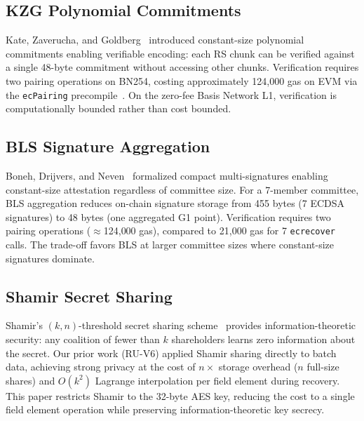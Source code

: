 \subsection{KZG Polynomial Commitments}

Kate, Zaverucha, and Goldberg~\cite{kate2010} introduced constant-size
polynomial commitments enabling verifiable encoding: each RS chunk can be
verified against a single 48-byte commitment without accessing other
chunks. Verification requires two pairing operations on BN254, costing
approximately 124{,}000 gas on EVM via the \texttt{ecPairing}
precompile~\cite{eip196, eip197}. On the zero-fee Basis Network L1,
verification is computationally bounded rather than cost bounded.

\subsection{BLS Signature Aggregation}

Boneh, Drijvers, and Neven~\cite{boneh2018} formalized compact
multi-signatures enabling constant-size attestation regardless of
committee size. For a 7-member committee, BLS aggregation reduces
on-chain signature storage from 455 bytes (7 ECDSA signatures) to 48
bytes (one aggregated G1 point). Verification requires two pairing
operations ($\approx$124{,}000 gas), compared to 21{,}000 gas for 7
\texttt{ecrecover} calls. The trade-off favors BLS at larger committee
sizes where constant-size signatures dominate.

\subsection{Shamir Secret Sharing}

Shamir's $(k,n)$-threshold secret sharing scheme~\cite{shamir1979}
provides information-theoretic security: any coalition of fewer than $k$
shareholders learns zero information about the secret. Our prior work
(RU-V6) applied Shamir sharing directly to batch data, achieving strong
privacy at the cost of $n\times$ storage overhead ($n$ full-size shares)
and $O(k^2)$ Lagrange interpolation per field element during recovery.
This paper restricts Shamir to the 32-byte AES key, reducing the cost to
a single field element operation while preserving information-theoretic
key secrecy.

